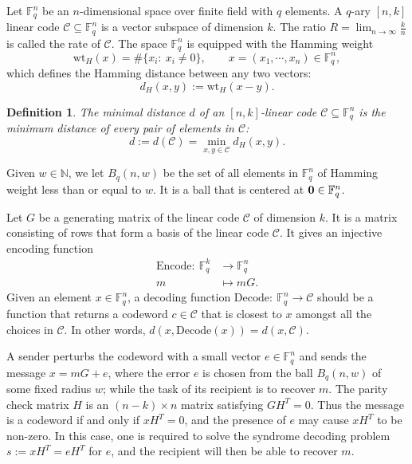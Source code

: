 \documentclass{article}
\newtheorem{definition}{Definition}%
\begin{document}
Let $\mathbb{F}_{q}^{n}$ be an $n$-dimensional space over finite field with $q$ elements. A $q$-ary $[n,k]$ linear code $\mathcal{C}\subseteq \mathbb{F}_{q}^{n}$ is a vector subspace of dimension $k$. The ratio $R=\lim_{n\rightarrow\infty}\frac{k}{n}$ is called the rate  of $\mathcal{C}$. The space $\mathbb{F}_{q}^{n}$ is equipped with the Hamming weight
\[
  \text{wt}_{H}(x)=\#\{x_{i}:\ x_{i}\neq 0\},\qquad x=(x_{1},\cdots,x_{n})\in\mathbb{F}_{q}^{n},
\]
which defines the Hamming distance between any two vectors:
\[
  d_{H}(x,y):=\text{wt}_{H}(x-y).
\]
\begin{definition}
  The minimal distance $d$ of an $[n,k]$-linear code $\mathcal{C}\subseteq \mathbb{F}_{q}^{n}$ is the minimum distance of every pair of elements in $\mathcal{C}$:
  \[
    d := d(\mathcal{C})=\min_{x,y\in\mathcal{C}} d_{H}(x,y).
  \]
\end{definition}

Given $w\in \mathbb{N}$, we let $B_{q}(n,w)$ be the set of all elements in $\mathbb{F}_{q}^{n}$ of Hamming weight less than or equal to $w$. It is a ball that is centered at ${\bf 0}\in\mathbb{F}_{q}^{n}$.

Let $G$ be a generating matrix of the linear code $\mathcal{C}$ of dimension $k$. It is a matrix consisting of rows that form a basis of the linear code $\mathcal{C}$. It gives an injective encoding function 
\begin{equation}
\begin{aligned}
\text{Encode}:\ \mathbb{F}_{q}^{k} &\longrightarrow \mathbb{F}_{q}^{n}\\
m &\longmapsto mG.
\end{aligned}
\end{equation}
Given an element $x\in\mathbb{F}_{q}^{n}$, a decoding function $\text{Decode}:\ \mathbb{F}_{q}^{n}\longrightarrow\mathcal{C}$ should be a function that returns a codeword $c\in\mathcal{C}$ that is closest to $x$ amongst all the choices in $\mathcal{C}$. In other words, $d(x,\text{Decode}(x))=d(x,\mathcal{C})$. 

A sender perturbs the codeword with a small vector $e\in\mathbb{F}_{q}^{n}$ and sends the message $x=mG+e$, where the error $e$ is chosen from the ball $B_{q}(n,w)$ of some fixed radius $w$; while the task of its recipient is to recover $m$. The parity check matrix $H$ is an $(n-k)\times n$ matrix satisfying $GH^{T}=0$. Thus the message is a codeword if and only if $xH^{T}=0$, and the presence of $e$ may cause $xH^{T}$ to be non-zero. In this case, one is required to solve the syndrome decoding problem $s:=xH^{T}=eH^{T}$ for $e$, and the recipient will then be able to recover $m$.
\end{document}
